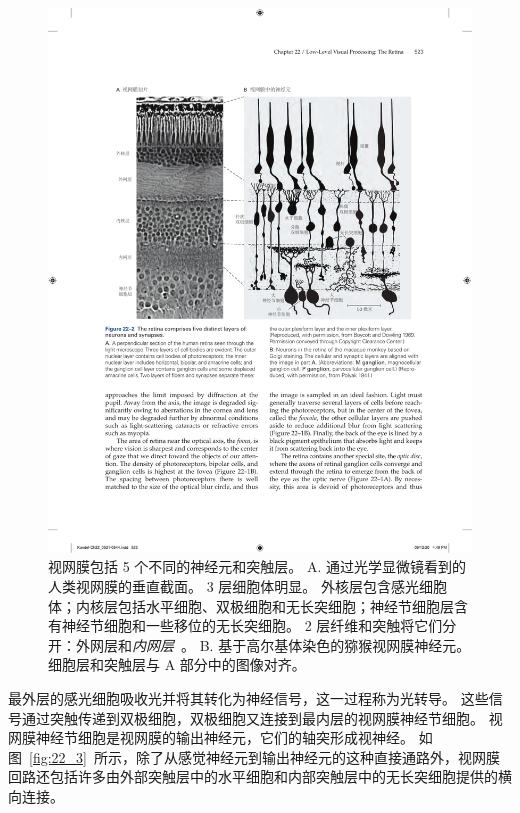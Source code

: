 \begin{figure}[htbp]
	\centering
	\includegraphics[width=1.0\linewidth]{chap22/fig_22_2}
	\caption{视网膜包括 5 个不同的神经元和突触层。
		A. 通过光学显微镜看到的人类视网膜的垂直截面。
		3 层细胞体明显。
		外核层包含感光细胞体；内核层包括水平细胞、双极细胞和无长突细胞；神经节细胞层含有神经节细胞和一些移位的无长突细胞。
		2 层纤维和突触将它们分开：外网层和\textit{内网层}~\cite{boycott1969organization}。
		B. 基于高尔基体染色的猕猴视网膜神经元。
		细胞层和突触层与 A 部分中的图像对齐\cite{polyak1941retina}。}
	\label{fig:22_2}
\end{figure}


最外层的感光细胞吸收光并将其转化为神经信号，这一过程称为光转导。
这些信号通过突触传递到双极细胞，双极细胞又连接到最内层的视网膜神经节细胞。
视网膜神经节细胞是视网膜的输出神经元，它们的轴突形成视神经。
如图~\ref{fig:22_3}~所示，除了从感觉神经元到输出神经元的这种直接通路外，视网膜回路还包括许多由外部突触层中的水平细胞和内部突触层中的无长突细胞提供的横向连接。


